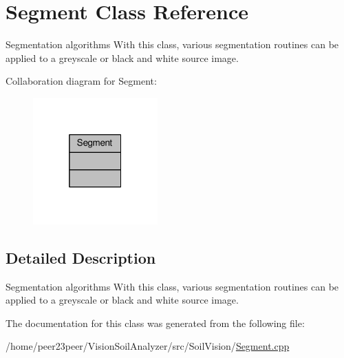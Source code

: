 \hypertarget{class_segment}{}\section{Segment Class Reference}
\label{class_segment}


Segmentation algorithms With this class, various segmentation routines can be applied to a greyscale or black and white source image.  




Collaboration diagram for Segment\+:\nopagebreak
\begin{figure}[H]
\begin{center}
\leavevmode
\includegraphics[width=136pt]{class_segment__coll__graph}
\end{center}
\end{figure}


\subsection{Detailed Description}
Segmentation algorithms With this class, various segmentation routines can be applied to a greyscale or black and white source image. 

The documentation for this class was generated from the following file\+:\begin{DoxyCompactItemize}
\item 
/home/peer23peer/\+Vision\+Soil\+Analyzer/src/\+Soil\+Vision/\hyperlink{_segment_8cpp}{Segment.\+cpp}\end{DoxyCompactItemize}
